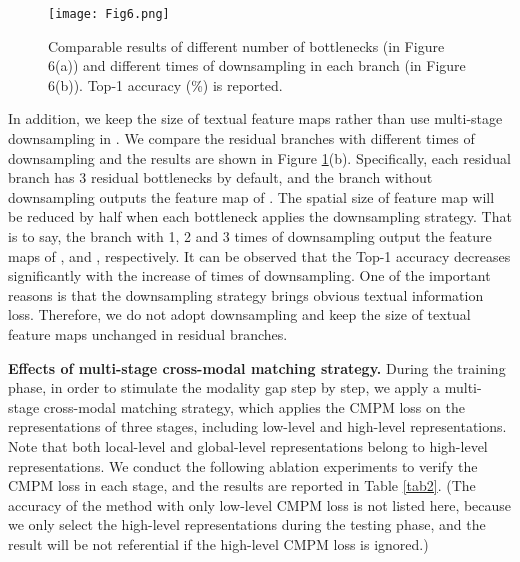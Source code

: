 \documentclass[review]{elsarticle}
\begin{document}
\begin{figure}[!t]
\centering
\texttt{[image: Fig6.png]}\\
\caption{Comparable results of different number of bottlenecks (in Figure 6(a)) and different times of downsampling in each branch (in Figure 6(b)). Top-1 accuracy (\%) is reported.}
\label{fig6}
\end{figure}


In addition, we keep the size of textual feature maps rather than use multi-stage downsampling in \cite{12}. We compare the residual branches with different times of downsampling and the results are shown in Figure \ref{fig6}(b). Specifically, each residual branch has 3 residual bottlenecks by default, and the branch without downsampling outputs the feature map of . The spatial size of feature map will be reduced by half when each bottleneck applies the downsampling strategy. That is to say, the branch with 1, 2 and 3 times of downsampling output the feature maps of ,  and , respectively. It can be observed that the Top-1 accuracy decreases significantly with the increase of times of downsampling. One of the important reasons is that the downsampling strategy brings obvious textual information loss. Therefore, we do not adopt downsampling and keep the size of textual feature maps unchanged in residual branches.

\textbf{Effects of multi-stage cross-modal matching strategy.} During the training phase, in order to stimulate the modality gap step by step, we apply a multi-stage cross-modal matching strategy, which applies the CMPM loss on the representations of three stages, including low-level and high-level representations. Note that both local-level and global-level representations belong to high-level representations. We conduct the following ablation experiments to verify the CMPM loss in each stage, and the results are reported in Table \ref{tab2}. (The accuracy of the method with only low-level CMPM loss is not listed here, because we only select the high-level representations during the testing phase, and the result will be not referential if the high-level CMPM loss is ignored.)
\end{document}
